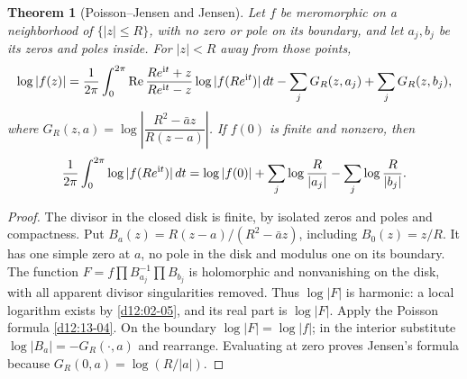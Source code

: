 \documentclass[11pt,a4paper,openany]{book}
\newtheorem{theorem}{Theorem}[chapter]
\theoremstyle{definition}
\theoremstyle{remark}\newtheorem{remark}[theorem]{Remark}
\DeclareMathOperator{\Ree}{Re}\DeclareMathOperator{\Imm}{Im}
\newcommand{\family}[1]{}
\begin{document}
\begin{theorem}[Poisson--Jensen and Jensen]\label{d12:17-01}\family{D12.17.01}
Let $f$ be meromorphic on a neighborhood of $\{|z|\le R\}$, with no
zero or pole on its boundary, and let $a_j,b_j$ be its zeros and poles
inside. For $|z|<R$ away from those points,
\[
 \log|f(z)|=\frac1{2\pi}\int_0^{2\pi}
 \Ree\frac{Re^{\iu t}+z}{Re^{\iu t}-z}\log|f(Re^{\iu t})|\,dt
 -\sum_j G_R(z,a_j)+\sum_jG_R(z,b_j),
\]
where $G_R(z,a)=\log\left|\dfrac{R^2-\bar a z}{R(z-a)}\right|$.
If $f(0)$ is finite and nonzero, then
\[
 \frac1{2\pi}\int_0^{2\pi}\log|f(Re^{\mathrm i t})|\,dt
 =\log|f(0)|+\sum_j\log\frac R{|a_j|}-\sum_j\log\frac R{|b_j|}.
\]
\end{theorem}
\begin{proof}
The divisor in the closed disk is finite, by isolated zeros and poles
and compactness. Put $B_a(z)=R(z-a)/(R^2-\bar a z)$, including
$B_0(z)=z/R$. It has one simple zero at $a$, no pole in the disk and
modulus one on its boundary. The function
$F=f\prod B_{a_j}^{-1}\prod B_{b_j}$ is holomorphic and nonvanishing
on the disk, with all apparent divisor singularities removed. Thus
$\log|F|$ is harmonic: a local logarithm exists by
\cref{d12:02-05}, and its real part is $\log|F|$.
Apply the Poisson formula \cref{d12:13-04}. On the boundary
$\log|F|=\log|f|$; in the interior substitute
$\log|B_a|=-G_R(\cdot,a)$ and rearrange. Evaluating at zero proves
Jensen's formula because $G_R(0,a)=\log(R/|a|)$.
\end{proof}
\end{document}
